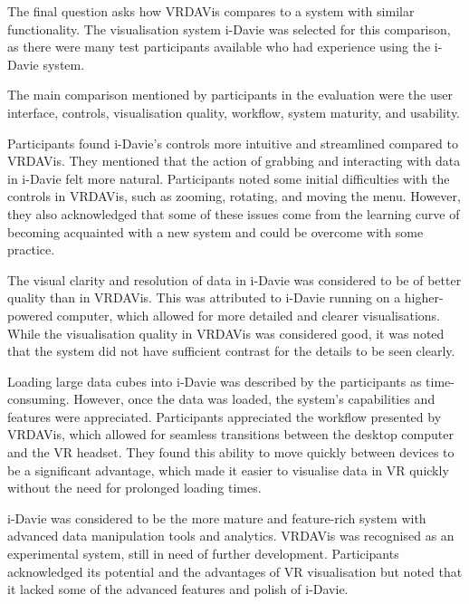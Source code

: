 The final question asks how VRDAVis compares to a system with similar functionality.
The visualisation system i-Davie was selected for this comparison, as there were many test participants available who had experience using the i-Davie system.

The main comparison mentioned by participants in the evaluation were the user interface, controls, visualisation quality, workflow, system maturity, and usability.

Participants found i-Davie's controls more intuitive and streamlined compared to VRDAVis. 
They mentioned that the action of grabbing and interacting with data in i-Davie felt more natural.
Participants noted some initial difficulties with the controls in VRDAVis, such as zooming, rotating, and moving the menu. 
However, they also acknowledged that some of these issues come from the learning curve of becoming acquainted with a new system and could be overcome with some practice.

The visual clarity and resolution of data in i-Davie was considered to be of better quality than in VRDAVis. 
This was attributed to i-Davie running on a higher-powered computer, which allowed for more detailed and clearer visualisations.
While the visualisation quality in VRDAVis was considered good, it was noted that the system did not have sufficient contrast for the details to be seen clearly.

Loading large data cubes into i-Davie was described by the participants as time-consuming. 
However, once the data was loaded, the system's capabilities and features were appreciated.
Participants appreciated the workflow presented by VRDAVis, which allowed for seamless transitions between the desktop computer and the VR headset. 
They found this ability to move quickly between devices to be a significant advantage, which made it easier to visualise data in VR quickly without the need for prolonged loading times.

i-Davie was considered to be the more mature and feature-rich system with advanced data manipulation tools and analytics.
VRDAVis was recognised as an experimental system, still in need of further development. 
Participants acknowledged its potential and the advantages of VR visualisation but noted that it lacked some of the advanced features and polish of i-Davie.

